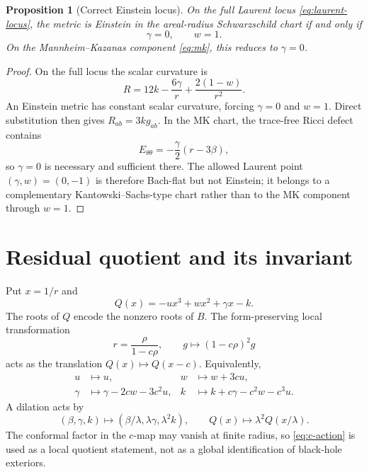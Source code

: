 \documentclass[11pt]{article}
\newtheorem{proposition}[theorem]{Proposition}
\theoremstyle{definition}
\theoremstyle{remark}
\begin{document}
\begin{proposition}[Correct Einstein locus]
\label{prop:einstein}
On the full Laurent locus \eqref{eq:laurent-locus}, the metric is Einstein
in the areal-radius Schwarzschild chart if and only if
\begin{equation}
 \gamma=0,\qquad w=1.
\end{equation}
On the Mannheim--Kazanas component \eqref{eq:mk}, this reduces to
\(\gamma=0\).
\end{proposition}

\begin{proof}
On the full locus the scalar curvature is
\begin{equation}
 R=12k-\frac{6\gamma}{r}+\frac{2(1-w)}{r^2}.
\end{equation}
An Einstein metric has constant scalar curvature, forcing
\(\gamma=0\) and \(w=1\).  Direct substitution then gives
\(R_{ab}=3k g_{ab}\).  In the MK chart, the trace-free Ricci defect contains
\[
 E_{\theta\theta}=-\frac{\gamma}{2}(r-3\beta),
\]
so \(\gamma=0\) is necessary and sufficient there.  The allowed Laurent
point \((\gamma,w)=(0,-1)\) is therefore Bach-flat but not Einstein; it
belongs to a complementary Kantowski--Sachs-type chart rather than to the
MK component through \(w=1\).
\end{proof}

\section{Residual quotient and its invariant}

Put \(x=1/r\) and
\begin{equation}
 Q(x)=-ux^3+wx^2+\gamma x-k.
\end{equation}
The roots of \(Q\) encode the nonzero roots of \(B\).  The form-preserving
local transformation
\begin{equation}
 r=\frac{\rho}{1-c\rho},\qquad
 g\longmapsto(1-c\rho)^2g
\end{equation}
acts as the translation \(Q(x)\mapsto Q(x-c)\).  Equivalently,
\begin{align}
 u&\longmapsto u,&
 w&\longmapsto w+3cu,\nonumber\\
 \gamma&\longmapsto\gamma-2cw-3c^2u,&
 k&\longmapsto k+c\gamma-c^2w-c^3u.
\label{eq:c-action}
\end{align}
A dilation acts by
\begin{equation}
 (\beta,\gamma,k)\longmapsto
 (\beta/\lambda,\lambda\gamma,\lambda^2k),
 \qquad
 Q(x)\longmapsto\lambda^2Q(x/\lambda).
\end{equation}
The conformal factor in the \(c\)-map may vanish at finite radius, so
\eqref{eq:c-action} is used as a local quotient statement, not as a global
identification of black-hole exteriors.
\end{document}
